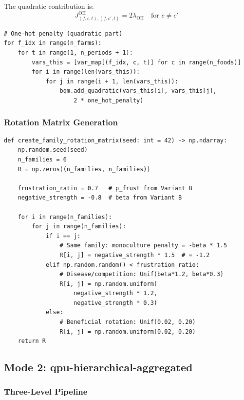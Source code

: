 \documentclass[11pt,a4paper]{article}
\begin{document}
The quadratic contribution is:
\begin{equation}
J^{\text{OH}}_{(f,c,t),(f,c',t)} = 2\lambda_{\text{OH}} \quad \text{for } c \neq c'
\end{equation}

\begin{lstlisting}[caption={One-Hot Penalty Implementation}]
# One-hot penalty (quadratic part)
for f_idx in range(n_farms):
    for t in range(1, n_periods + 1):
        vars_this = [var_map[(f_idx, c, t)] for c in range(n_foods)]
        for i in range(len(vars_this)):
            for j in range(i + 1, len(vars_this)):
                bqm.add_quadratic(vars_this[i], vars_this[j], 
                    2 * one_hot_penalty)
\end{lstlisting}

\subsubsection{Rotation Matrix Generation}

\begin{lstlisting}[caption={Family Rotation Matrix (matching Variant B Eq. 10)}]
def create_family_rotation_matrix(seed: int = 42) -> np.ndarray:
    np.random.seed(seed)
    n_families = 6
    R = np.zeros((n_families, n_families))
    
    frustration_ratio = 0.7   # p_frust from Variant B
    negative_strength = -0.8  # beta from Variant B
    
    for i in range(n_families):
        for j in range(n_families):
            if i == j:
                # Same family: monoculture penalty = -beta * 1.5
                R[i, j] = negative_strength * 1.5  # = -1.2
            elif np.random.random() < frustration_ratio:
                # Disease/competition: Unif(beta*1.2, beta*0.3)
                R[i, j] = np.random.uniform(
                    negative_strength * 1.2, 
                    negative_strength * 0.3)
            else:
                # Beneficial rotation: Unif(0.02, 0.20)
                R[i, j] = np.random.uniform(0.02, 0.20)
    return R
\end{lstlisting}

\subsection{Mode 2: qpu-hierarchical-aggregated}

\subsubsection{Three-Level Pipeline}
\end{document}
